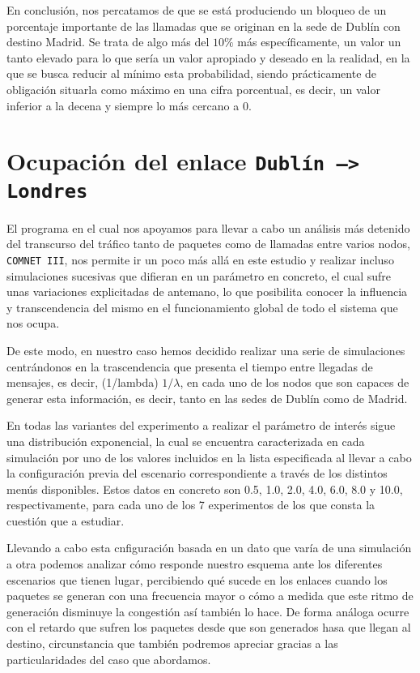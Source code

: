 \documentclass{article}[10pt]
\begin{document}
		En conclusión, nos percatamos de que se está produciendo un bloqueo de un porcentaje importante de las llamadas que se originan en la sede de Dublín con destino Madrid. Se trata de algo más del $10\%$ más específicamente, un valor un tanto elevado para lo que sería un valor apropiado y deseado en la realidad, en la que se busca reducir al mínimo esta probabilidad, siendo prácticamente de obligación situarla como máximo en una cifra porcentual, es decir, un valor inferior a la decena y siempre lo más cercano a 0.

	\section{Ocupación del enlace \texttt{Dublín --> Londres}}
		El programa en el cual nos apoyamos para llevar a cabo un análisis más detenido del transcurso del tráfico tanto de paquetes como de llamadas entre varios nodos, \texttt{COMNET III}, nos permite ir un poco más allá en este estudio y realizar incluso simulaciones sucesivas que difieran en un parámetro en concreto, el cual sufre unas variaciones explicitadas de antemano, lo que posibilita conocer la influencia y transcendencia del mismo en el funcionamiento global de todo el sistema que nos ocupa.

		De este modo, en nuestro caso hemos decidido realizar una serie de simulaciones centrándonos en la trascendencia que presenta el tiempo entre llegadas de mensajes, es decir, (1/lambda) $1/\lambda$, en cada uno de los nodos que son capaces de generar esta información, es decir, tanto en las sedes de Dublín como de Madrid.

		En todas las variantes del experimento a realizar el parámetro de interés sigue una distribución exponencial, la cual se encuentra caracterizada en cada simulación por uno de los valores incluidos en la lista especificada al llevar a cabo la configuración previa del escenario correspondiente a través de los distintos menús disponibles. Estos datos en concreto son 0.5, 1.0, 2.0, 4.0, 6.0, 8.0 y 10.0, respectivamente, para cada uno de los 7 experimentos de los que consta la cuestión que a estudiar.

		Llevando a cabo esta cnfiguración basada en un dato que varía de una simulación a otra podemos analizar cómo responde nuestro esquema ante los diferentes escenarios que tienen lugar, percibiendo qué sucede en los enlaces cuando los paquetes se generan con una frecuencia mayor o cómo a medida que este ritmo de generación disminuye la congestión así también lo hace. De forma análoga ocurre con el retardo que sufren los paquetes desde que son generados hasa que llegan al destino, circunstancia que también podremos apreciar gracias a las particularidades del caso que abordamos.
\end{document}
